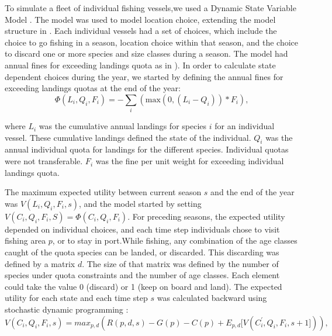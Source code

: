\documentclass[12pt,oneline,a4paper,numbib]{ouparticle}
\numberwithin{equation}{subsection} %
\begin{document}
To simulate a fleet of individual fishing vessels,we used a Dynamic State Variable Model \cite{Alzorriz2018, Batsleer2015, ClarkandMangel2000, Dowling2011, Houston1999, Poos2010}. The model was used to model location choice, extending the model structure in \cite{Batsleer2015}. Each individual vessels had a set of choices, which include the choice to go fishing in a season,  location choice within that season, and the choice to discard one or more species and size classes during a season. The model had annual fines for exceeding landings quota as in \cite{Alzorriz2018}). In order to calculate state dependent choices during the year, we started by defining the annual fines for exceeding landings quotas at the end of the year:
\begin{equation}
\Phi (L_i, Q_i, F_i)= -\sum_i (\textrm{max}( 0, (L_i - Q_i))* F_i),
\end{equation}

where $L_i$ was the cumulative annual landings for species $i$ for an individual vessel. These cumulative landings defined the state of the individual. $Q_i$ was the annual individual quota for landings for the different species. Individual quotas were not transferable. $F_i$ was the fine per unit weight for exceeding individual landings quota.

The maximum expected utility between current season $s$ and the end of the year was $V (L_i, Q_i, F_i, s)$, and the model started by setting $V (C_i, Q_i, F_i, S)= \Phi (C_i, Q_i, F_i)$. For preceding seasons, the expected utility depended on individual choices, and each time step individuals chose to visit fishing area $p$, or to stay in port.While fishing, any combination of the age classes caught of the quota species can be landed, or discarded. This discarding was defined by a matrix $d$. The size of that matrix was defined by the number of species under quota constraints and the number of age classes. Each element could take the value 0 (discard) or 1 (keep on board and land). The expected utility for each state and each time step $s$ was calculated backward using stochastic dynamic programming \cite{ClarkandMangel2000}:
\begin{equation}
V (C_i, Q_i, F_i, s) = max_{p,d}( R(p, d, s)- G(p) - C(p) + E_{p, d}[V (C_i^\prime, Q_i, F_i, s+1])),
\end{equation}
\end{document}
